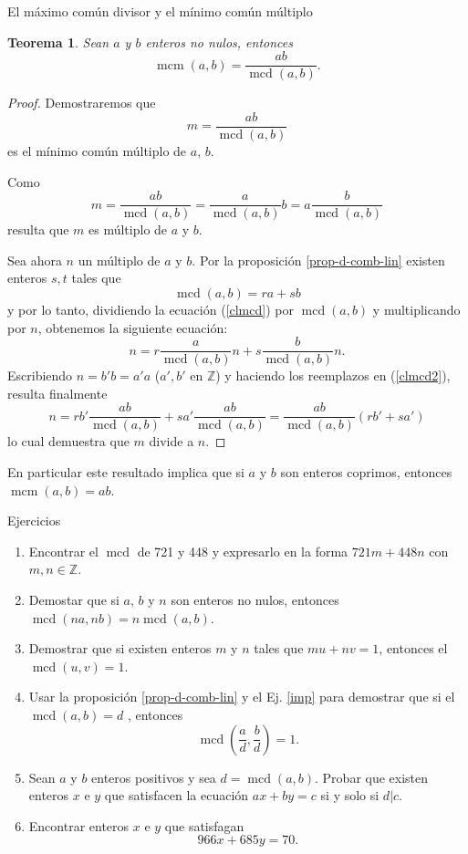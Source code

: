 \documentclass[11pt,spanish,makeidx]{amsbook}
\newtheorem{teorema}{Teorema}[section]
\theoremstyle{definition}
\theoremstyle{remark}
\newcommand \mcd{\operatorname{mcd}}
\newcommand \mcm{\operatorname{mcm}}
\begin{document}
\begin{section}{El máximo común divisor y el mínimo común múltiplo}
\begin{teorema}\label{t1.7.2} Sean $a$ y $b$ enteros no nulos, entonces
$$
\mcm(a,b)=\frac{a b}{\mcd(a,b)}.
$$
\end{teorema}
\begin{proof} Demostraremos que
$$
m=\frac{a b}{\mcd(a,b)}
$$
es el mínimo común múltiplo de $a$, $b$.

Como
$$
m=\frac{a b}{\mcd(a,b)}=\frac{a}{\mcd(a,b)} b
=a\frac{b}{\mcd(a,b)}
$$
resulta que $m$ es múltiplo de $a$ y $b$.

Sea ahora $n$ un múltiplo de $a$ y $b$. Por la proposición \ref{prop-d-comb-lin} existen enteros $s,t$ tales que 
\begin{equation}\label{clmcd}
\mcd(a,b)=ra+sb
\end{equation} 
y por lo tanto,
dividiendo la ecuación (\ref{clmcd}) por $\mcd(a,b)$ y multiplicando por $n$, obtenemos la siguiente ecuación:
\begin{equation}\label{clmcd2}
n= r\frac{a}{\mcd(a,b)}n + s\frac{b}{\mcd(a,b)}n.
\end{equation} 
Escribiendo $n=b'b=a'a$ ($a',b'$ en $\mathbb Z$) y haciendo los reemplazos en (\ref{clmcd2}), resulta finalmente
\begin{equation}\label{clmcd3}
n= rb'\frac{a b}{\mcd(a,b)}+sa'\frac{a b}{\mcd(a,b)}= \frac{a b}{\mcd(a,b)}(rb'+sa')
\end{equation}
lo cual demuestra que $m$ divide a $n$.
\end{proof}

En particular este resultado implica que si $a$ y $b$ son enteros coprimos, entonces $\mcm(a,b)=ab$.

\begin{subsection}{Ejercicios}
\begin{enumerate}
\item Encontrar el $\mcd$ de 721 y 448 y expresarlo en la forma
$721m+448n$ con $m,n \in \mathbb Z$.
\item Demostar que si $a$, $b$ y $n$ son enteros no nulos, entonces
$\mcd(na,nb)=n\mcd(a,b)$.
\item\label{imp} Demostrar que si existen enteros $m$ y $n$ tales que $mu+nv=1$, entonces el
$\mcd(u,v)=1$.
\item Usar la proposición \ref{prop-d-comb-lin} y el Ej. \ref{imp} para demostrar que si el
$\mcd(a,b)=d$ , entonces
$$
\mcd\left(\frac{a}{d},\frac{b}{d}\right) =1.
$$
\item  Sean $a$ y $b$ enteros positivos y sea $d=\mcd(a,b)$. Probar que existen enteros $ x$ e $y$ que satisfacen la ecuación $ax+by=c$ si y solo si $d|c$.
\item  Encontrar enteros $x$ e $y$ que satisfagan
$$
966x+685y=70.
$$
\end{enumerate}
\end{subsection}

\end{section}
\end{document}
